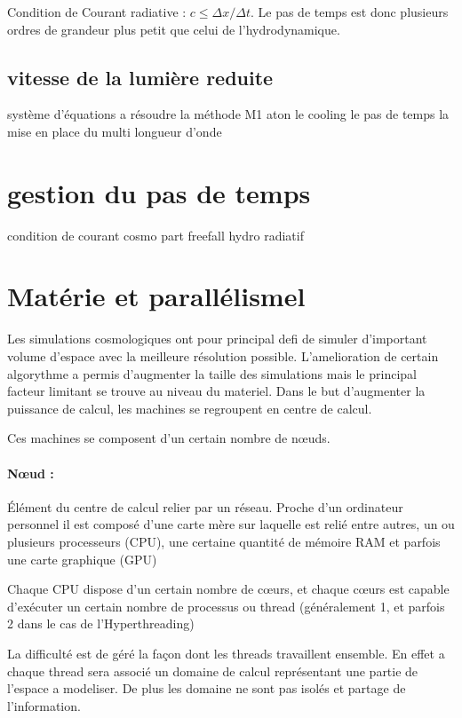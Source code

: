 Condition de Courant radiative : $ c \leq \Delta x / \Delta t $.
Le pas de temps est donc plusieurs ordres de grandeur plus petit que celui de l'hydrodynamique.

\subsection{vitesse de la lumière reduite}


système d'équations a résoudre
la méthode M1
aton
le cooling
le pas de temps
la mise en place du multi longueur d'onde

\section{gestion du pas de temps}

condition de courant
cosmo
part
freefall
hydro
radiatif

\section{Matérie et parallélismel}

Les simulations cosmologiques ont pour principal defi de simuler d'important volume d'espace avec la meilleure résolution possible.
L'amelioration de certain algorythme a permis d'augmenter la taille des simulations mais le principal facteur limitant se trouve au niveau du materiel.
Dans le but d'augmenter la puissance de calcul, les machines se regroupent en centre de calcul.

Ces machines se composent d'un certain nombre de nœuds.

\paragraph{Nœud :} Élément du centre de calcul relier par un réseau.
Proche d'un ordinateur personnel il est composé d'une carte mère sur laquelle est relié entre autres, un ou plusieurs processeurs (CPU), une certaine quantité de mémoire RAM et parfois une carte graphique (GPU)

Chaque CPU dispose d'un certain nombre de cœurs, et chaque cœurs est capable d'exécuter un certain nombre de processus ou thread (généralement 1, et parfois 2 dans le cas de l'Hyperthreading)

La difficulté est de géré la façon dont les threads travaillent ensemble.
En effet a chaque thread sera associé un domaine de calcul représentant une partie de l'espace a modeliser.
De plus les domaine ne sont pas isolés et partage de l'information. 

